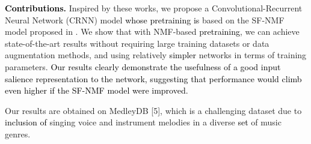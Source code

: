 \documentclass{article}
\newcommand{\gp}[1]{{\textcolor{black}{#1}}}
\newcommand{\secor}[2]{{\textcolor{black}{#2}}}
\newcommand{\jb}[1]{{\textcolor{black}{#1}}}
\newcommand{\jbcor}[2]{{\textcolor{black}{#2}}}
\begin{document}
\textbf{\secor{Proposal}{Contributions}. }
Inspired by these works, we propose a
Convolutional-Recurrent Neural Network (CRNN) model
\jb{whose pretraining is}
based on the SF-NMF model
proposed in \cite{Durrieu}. 
We show that with NMF-based \jbcor{pre-training}{pretraining},
we can achieve state-of-the-art results without
requiring %
large training datasets or data augmentation
methods, and using relatively \jbcor{less complex}{simpler} networks in
terms of training parameters.
\jb{Our results clearly demonstrate the usefulness of a good input salience representation to the network, suggesting that performance would climb even higher if the SF-NMF model were improved.} 

Our results are obtained on MedleyDB [5],
which is a
challenging dataset due to \jbcor{existing}{inclusion of} singing
voice and instrument melodies in a diverse \jbcor{number}{set} of music
genres.
\end{document}
